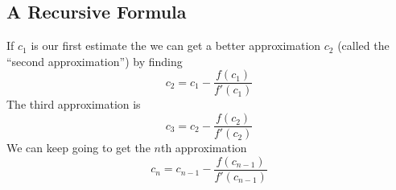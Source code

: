 \subsection{A Recursive Formula}
If $c_1$ is our first estimate the we can get a better approximation $c_2$ (called the ``second approximation'') by finding
\begin{equation*}
    c_2 = c_1 - \dfrac{f(c_1)}{f'(c_1)}
\end{equation*}
The third approximation is
\begin{equation*}
    c_3 = c_2 - \dfrac{f(c_2)}{f'(c_2)}
\end{equation*}
We can keep going to get the $n$th approximation
\begin{equation*}
    c_n = c_{n - 1} - \dfrac{f(c_{n - 1})}{f'(c_{n - 1})}
\end{equation*}
